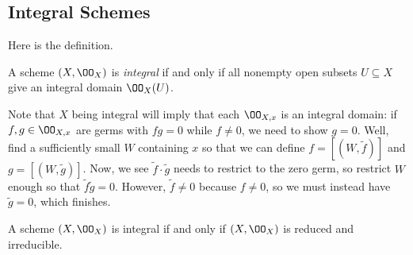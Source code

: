 \documentclass[../notes.tex]{subfiles}
\begin{document}
\subsection{Integral Schemes}
Here is the definition.
\begin{definition}[Integral]
	A scheme $(X,\OO_X)$ is \textit{integral} if and only if all nonempty open subsets $U\subseteq X$ give an integral domain $\OO_X(U)$.
\end{definition}
\begin{remark} \label{rem:integral-at-stalks}
	Note that $X$ being integral will imply that each $\OO_{X,x}$ is an integral domain: if $f,g\in\OO_{X,x}$ are germs with $fg=0$ while $f\ne0$, we need to show $g=0$. Well, find a sufficiently small $W$ containing $x$ so that we can define $f=[(W,\widetilde f)]$ and $g=[(W,\widetilde g)]$. Now, we see $\widetilde f\cdot\widetilde g$ needs to restrict to the zero germ, so restrict $W$ enough so that $\widetilde f\widetilde g=0$. However, $\widetilde f\ne0$ because $f\ne0$, so we must instead have $\widetilde g=0$, which finishes.
\end{remark}
\begin{proposition} \label{prop:integral-is-reduced-irred}
	A scheme $(X,\OO_X)$ is integral if and only if $(X,\OO_X)$ is reduced and irreducible.
\end{proposition}
\end{document}
